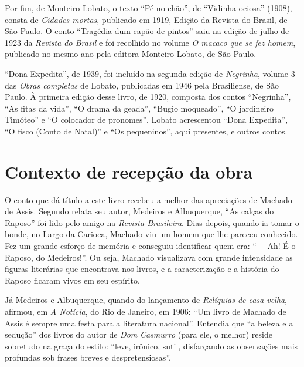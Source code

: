 Por fim, de Monteiro Lobato, o texto ``Pé no chão'', de ``Vidinha
ociosa'' (1908), consta de \emph{Cidades mortas}, publicado em 1919,
Edição da Revista do Brasil, de São Paulo. O conto ``Tragédia dum capão
de pintos'' saiu na edição de julho de 1923 da \emph{Revista do Brasil}
e foi recolhido no volume \emph{O macaco que se fez homem}, publicado no
mesmo ano pela editora Monteiro Lobato, de São Paulo.

``Dona Expedita'', de 1939, foi incluído na segunda edição de
\emph{Negrinha}, volume 3 das \emph{Obras completas} de Lobato,
publicadas em 1946 pela Brasiliense, de São Paulo. À primeira edição
desse livro, de 1920, composta dos contos ``Negrinha'', ``As fitas da
vida'', ``O drama da geada'', ``Bugio moqueado'', ``O jardineiro
Timóteo'' e ``O colocador de pronomes'', Lobato acrescentou ``Dona
Expedita'', ``O fisco (Conto de Natal)'' e ``Os pequeninos'', aqui
presentes, e outros contos.

\section{Contexto de recepção da obra}

O conto que dá título a este livro recebeu a melhor das apreciações de
Machado de Assis. Segundo relata seu autor, Medeiros e Albuquerque, ``As
calças do Raposo'' foi lido pelo amigo na \emph{Revista Brasileira}.
Dias depois, quando ia tomar o bonde, no Largo da Carioca, Machado viu
um homem que lhe pareceu conhecido. Fez um grande esforço de memória e
conseguiu identificar quem era: ``--- Ah! É o Raposo, do Medeiros!''. Ou
seja, Machado visualizava com grande intensidade as figuras literárias
que encontrava nos livros, e a caracterização e a história do Raposo
ficaram vivos em seu espírito.

Já Medeiros e Albuquerque, quando do lançamento de \emph{Relíquias de
casa velha}, afirmou, em \emph{A Notícia}, do Rio de Janeiro, em 1906:
``Um livro de Machado de Assis é sempre uma festa para a literatura
nacional''. Entendia que ``a beleza e a sedução'' dos livros do autor de
\emph{Dom} \emph{Casmurro} (para ele, o melhor) reside sobretudo na
graça do estilo: ``leve, irônico, sutil, disfarçando as observações mais
profundas sob frases breves e despretensiosas''.

